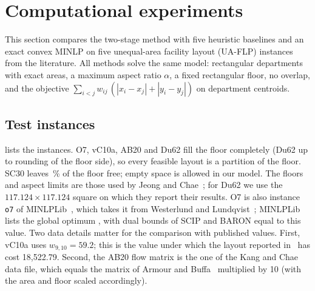 %
\providecommand{\bxdir}{}


\section{Computational experiments}
\label{sec:bx}

This section compares the two-stage method with five heuristic baselines and an exact convex MINLP on five
unequal-area facility layout (UA-FLP) instances from the literature. All methods solve the same model:
rectangular departments with exact areas, a maximum aspect ratio $\alpha$, a fixed rectangular floor, no
overlap, and the objective $\sum_{i<j} w_{ij}\,(|x_i-x_j|+|y_i-y_j|)$ on department centroids.

\subsection{Test instances}
\label{sec:bx-instances}

 lists the instances. O7, vC10a, AB20 and Du62 fill the floor completely (Du62 up to
rounding of the floor side), so every feasible layout is a partition of the floor. SC30 leaves
\bxFreeSCthirty\,\% of the floor free; empty space is allowed in our model.
The floors and aspect limits are those used by Jeong and Chae~\cite{jeong2026}; for Du62 we use the
$117.124\times117.124$ square on which they report their results. O7 is also instance \texttt{o7} of
MINLPLib~\cite{minlplib_o7}, which takes it from Westerlund and Lundqvist~\cite{westerlund2001}; MINLPLib lists
the global optimum \bxRefOsevenFull, with dual bounds of SCIP and BARON equal to this value. Two data details
matter for the comparison with published values. First, vC10a uses $w_{9,10}=59.2$; this is the value under which
the layout reported in~\cite{jeong2026} has cost 18{,}522.79. Second, the AB20 flow matrix is the one of the Kang
and Chae data file, which equals the matrix of Armour and Buffa~\cite{armour1963} multiplied by 10 (with the area
and floor scaled accordingly).


